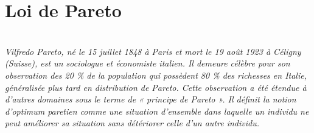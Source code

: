 \documentclass[a4paper]{article}
\begin{document}
\section{Loi de Pareto}
\small \textit{~\\ Vilfredo Pareto, né le 15 juillet 1848 à Paris et mort le 19 août 1923 à Céligny (Suisse), est un sociologue et économiste italien. Il demeure célèbre pour son observation des 20 \% de la population qui possèdent 80 \% des richesses en Italie, généralisée plus tard en distribution de Pareto. Cette observation a été étendue à d'autres domaines sous le terme de « principe de Pareto ».  Il définit la notion d'optimum paretien comme une situation d'ensemble dans laquelle un individu ne peut améliorer sa situation sans détériorer celle d'un autre individu. \\
 \vspace{5pt}}
\end{document}
